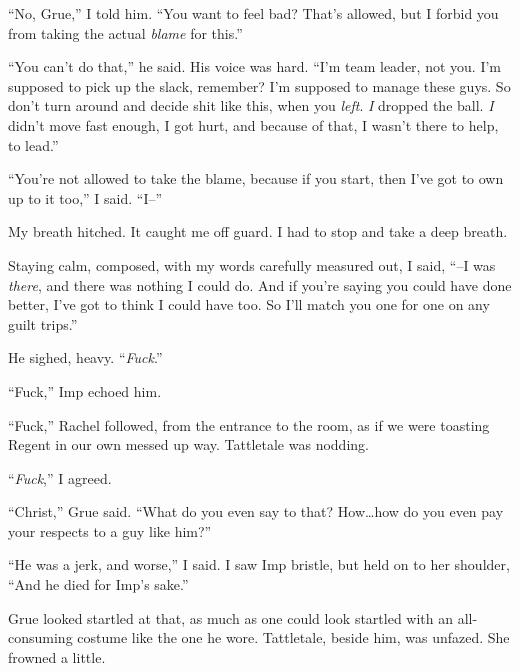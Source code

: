 ``No, Grue,'' I told him.  ``You want to feel bad?  That's allowed, but I forbid you from taking the actual \emph{blame} for this.''



``You can't do that,'' he said.  His voice was hard.  ``I'm team leader, not you.  I'm supposed to pick up the slack, remember?  I'm supposed to manage these guys.  So don't turn around and decide shit like this, when you \emph{left}.  \emph{I} dropped the ball.  \emph{I} didn't move fast enough, I got hurt, and because of that, I wasn't there to help, to lead.''



``You're not allowed to take the blame, because if you start, then I've got to own up to it too,'' I said.  ``I--''



My breath hitched.  It caught me off guard.  I had to stop and take a deep breath.



Staying calm, composed, with my words carefully measured out, I said, ``--I was \emph{there}, and there was nothing I could do.  And if you're saying you could have done better, I've got to think I could have too.  So I'll match you one for one on any guilt trips.''



He sighed, heavy.  ``\emph{Fuck}.''



``Fuck,'' Imp echoed him.



``Fuck,'' Rachel followed, from the entrance to the room, as if we were toasting Regent in our own messed up way.  Tattletale was nodding.



``\emph{Fuck},'' I agreed.



``Christ,'' Grue said.  ``What do you even say to that?  How\ldots how do you even pay your respects to a guy like him?''



``He was a jerk, and worse,'' I said.  I saw Imp bristle, but held on to her shoulder, ``And he died for Imp's sake.''



Grue looked startled at that, as much as one could look startled with an all-consuming costume like the one he wore.  Tattletale, beside him, was unfazed.  She frowned a little.



